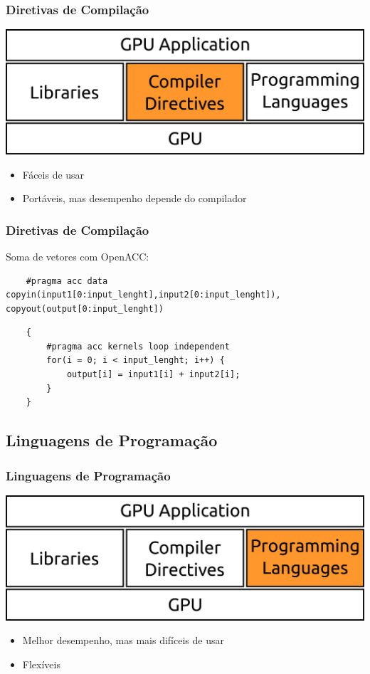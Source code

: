 \documentclass[10pt, compress]{beamer}
\begin{document}
\begin{frame}
    \frametitle{Diretivas de Compilação}
    \begin{center}
        \includegraphics[width=.6\textwidth]{accel_apps_comp}
    \end{center}
    \begin{itemize}
        \item Fáceis de usar
            \pause
        \item Portáveis, mas desempenho depende do compilador
    \end{itemize}
\end{frame}

\begin{frame}[fragile]
    \frametitle{Diretivas de Compilação}
    Soma de vetores com \alert{OpenACC}:
    \begin{lstlisting}
    #pragma acc data copyin(input1[0:input_lenght],input2[0:input_lenght]), copyout(output[0:input_lenght])
    \end{lstlisting}
    \pause
    \begin{lstlisting}
    {
        #pragma acc kernels loop independent
        for(i = 0; i < input_lenght; i++) {
            output[i] = input1[i] + input2[i];
        }
    }
    \end{lstlisting}
\end{frame}

\subsection{Linguagens de Programação}

\begin{frame}
    \frametitle{Linguagens de Programação}
    \begin{center}
        \includegraphics[width=.6\textwidth]{accel_apps_lang}
    \end{center}
    \begin{itemize}
        \item Melhor desempenho, mas mais difíceis de usar
            \pause
        \item Flexíveis
    \end{itemize}
\end{frame}
\end{document}
